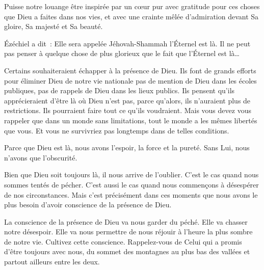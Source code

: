 Puisse notre louange être inspirée par un cœur pur
 \ocadr avec gratitude pour ces choses que Dieu a faites dans nos vies, 
et avec une crainte mêlée d'admiration devant Sa gloire,
 Sa majesté et Sa beauté. 

\dvrule






 Ézéchiel a dit~: 
 \og Elle sera appelée Jéhovah-Shammah \ocadr l'Éternel est là. \fg{}
 Il ne peut pas penser à quelque chose de plus glorieux
 que le fait que l'Éternel est là\dots{}

Certains souhaiteraient échapper à la présence de Dieu.
 Ils font de grands efforts pour éliminer Dieu de notre vie nationale
 \ocadr pas de mention de Dieu dans les écoles publiques,
 pas de rappels de Dieu dans les lieux publics.
 Ils pensent qu'ils apprécieraient d'être là où Dieu n'est pas,
 parce qu'alors, ils n'auraient plus de restrictions.
 Ils pourraient faire tout ce qu'ils voudraient.
 Mais vous devez vous rappeler que dans un monde sans limitations,
 tout le monde a les mêmes libertés que vous.
 Et vous ne survivriez pas longtemps dans de telles conditions. 


Parce que Dieu est là, nous avons l'espoir, la force et la pureté.
 Sans Lui, nous n'avons que l'obscurité. 

Bien que Dieu soit toujours là, il nous arrive de l'oublier.
 C'est le cas quand nous sommes tentés de pécher.
 C'est aussi le cas quand nous commençons à désespérer de nos circonstances.
 Mais c'est précisément dans ces moments que nous avons le plus besoin
 d'avoir conscience de la présence de Dieu. 

La conscience de la présence de Dieu va nous garder du péché.
 Elle va chasser notre désespoir. Elle va nous permettre de nous réjouir
 à l'heure la plus sombre de notre vie. Cultivez cette conscience.
 Rappelez-vous de Celui qui a promis d'être toujours avec nous,
 du sommet des montagnes au plus bas des vallées
 et partout ailleurs entre les deux. 

\dvrule




